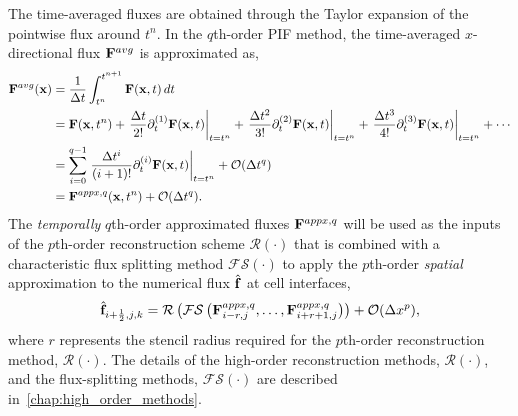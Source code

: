 The time-averaged fluxes
are obtained through the Taylor expansion of the pointwise
flux around \( t^{n} \).
In the \( q \)th-order PIF method,
the time-averaged \( x \)-directional flux \( \mathbf{F}^{avg} \)
is approximated as,
\begin{equation}\label{eq:pif_flux_taylor}
    \begin{split}
        \mathbf{F}^{avg} (\mathbf{x})
        &= \frac{1}{\Delta t} \int^{t^{n + 1}}_{t^n} \mathbf{F}(\mathbf{x}, t) \mathop{dt}\\
        &= \mathbf{F} (\mathbf{x}, t^{n})
            + \left. \frac{\Delta t}{2!} \partial_{t}^{(1)} \mathbf{F} (\mathbf{x}, t) \right|_{t = t^{n}}
            + \left. \frac{\Delta t^{2}}{3!} \partial_{t}^{(2)} \mathbf{F} (\mathbf{x}, t) \right|_{t = t^{n}}
            + \left. \frac{\Delta t^{3}}{4!} \partial_{t}^{(3)} \mathbf{F} (\mathbf{x}, t) \right|_{t = t^{n}}
            + \cdots \\
        &= \sum\limits_{i=0}^{q-1}
            \left.\frac{\Delta t^{i}}{(i+1)!} \partial_{t}^{(i)} \mathbf{F} (\mathbf{x}, t) \right|_{t = t^{n}} + \mathcal{O}(\Delta t^{q}) \\
        &= \mathbf{F}^{appx,q} (\mathbf{x}, t^{n}) + \mathcal{O}(\Delta t^{q}).
    \end{split}
\end{equation}
The \textit{temporally} \( q \)th-order approximated fluxes \( \mathbf{F}^{appx, q} \)
will be used
as the inputs of the \( p\)th-order reconstruction scheme \( \mathcal{R}(\cdot) \)
that is combined with a characteristic flux splitting method \( \mathcal{FS}(\cdot) \) 
to apply the \( p \)th-order \textit{spatial} approximation to
the numerical flux \( \hat{\mathbf{f}} \) at cell interfaces,
\begin{equation}\label{eq:num-flx}
    \hat{\mathbf{f}}_{i + \frac{1}{2}, j, k} =
        \mathcal{R}\left(
            \mathcal{FS}\left(\mathbf{F}^{appx, q}_{i-r, j}, \dots,
                \mathbf{F}^{appx, q}_{i+r+1, j}
        \right)
    \right)
    + \mathcal{O}(\Delta x^{p}),
\end{equation}
where \( r \) represents the stencil radius
required for the \( p \)th-order reconstruction method, \( \mathcal{R}(\cdot) \).
The details of the high-order reconstruction methods, \( \mathcal{R}(\cdot) \), and
the flux-splitting methods, \( \mathcal{FS}(\cdot) \) are described in~\cref{chap:high_order_methods}.

